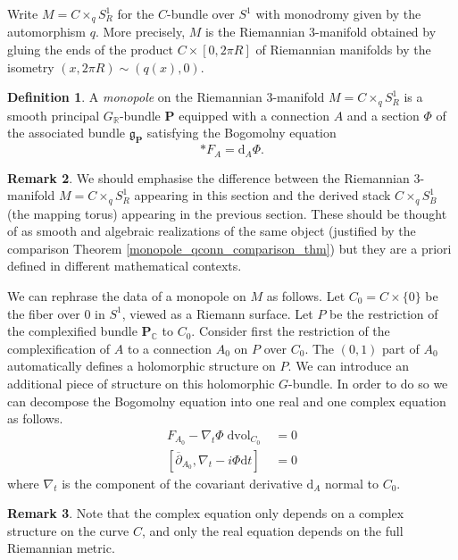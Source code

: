 \documentclass[11pt, oneside, reqno]{amsart}
\theoremstyle{definition} \newtheorem{definition}{Definition}[section]
\theoremstyle{definition} \newtheorem{remark}[definition]{Remark}
\theoremstyle{definition} \newtheorem{remarks}[definition]{Remarks}
\theoremstyle{definition} \newtheorem{question}[definition]{Question}
\theoremstyle{definition} \newtheorem*{note}{Note}
\theoremstyle{definition} \newtheorem{example}[definition]{Example}
\theoremstyle{definition} \newtheorem{examples}[definition]{Examples}
\renewcommand{\gg}{\mathfrak{g}}
\newcommand{\bo}[1]{\boldsymbol{#1}}
\newcommand{\del}{\partial}
\newcommand{\ol}[1]{\overline{#1}}
\newcommand{\CC}{\mathbb{C}}
\newcommand{\RR}{\mathbb{R}}
\DeclareMathOperator{\dvol}{dvol}
\renewcommand{\d}{\mathrm{d}}
\begin{document}
Write $M = C\times_q S^1_R$ for the $C$-bundle over $S^1$ with monodromy given by the automorphism $q$.  More precisely, $M$ is the Riemannian 3-manifold obtained by gluing the ends of the product $C \times [0,2\pi R]$ of Riemannian manifolds by the isometry $(x,2\pi R) \sim (q(x), 0)$.

\begin{definition}
A \emph{monopole} on the Riemannian 3-manifold $M = C \times_q S^1_R$ is a smooth principal $G_\RR$-bundle $\bo P$ equipped with a connection $A$ and a section $\Phi$ of the associated bundle $\gg_{\bo P}$ satisfying the Bogomolny equation 
\[\ast F_A = \d_A \Phi.\]
\end{definition}

\begin{remark}
We should emphasise the difference between the Riemannian 3-manifold $M = C \times_q S^1_R$ appearing in this section and the derived stack $C \times_q S^1_B$ (the mapping torus) appearing in the previous section.  These should be thought of as smooth and algebraic realizations of the same object (justified by the comparison Theorem \ref{monopole_qconn_comparison_thm}) but they are a priori defined in different mathematical contexts.
\end{remark}

We can rephrase the data of a monopole on $M$ as follows.  Let $C_0 = C \times \{0\}$ be the fiber over $0$ in $S^1$, viewed as a Riemann surface.  Let $P$ be the restriction of the complexified bundle $\bo P_\CC$ to $C_0$.  Consider first the restriction of the complexification of $A$ to a connection $A_0$ on $P$ over $C_0$.  The $(0,1)$ part of $A_0$ automatically defines a holomorphic structure on $P$.  We can introduce an additional piece of structure on this holomorphic $G$-bundle.  In order to do so we can decompose the Bogomolny equation into one real and one complex equation as follows.
\begin{align*}
F_{A_0} - \nabla_t \Phi \dvol_{C_0} &= 0 \\
[\ol{\del}_{A_0}, \nabla_t - i\Phi \d t] &= 0 
\end{align*}
where $\nabla_t$ is the component of the covariant derivative $\d_A$ normal to $C_0$.  

\begin{remark}
Note that the complex equation only depends on a complex structure on the curve $C$, and only the real equation depends on the full Riemannian metric.
\end{remark}
\end{document}
